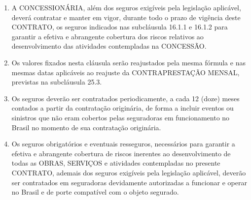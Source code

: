 \documentclass[a4paper,11pt]{report} %
\begin{document}
\begin{enumerate}
\item \label{itm:855U} A CONCESSIONÁRIA, além dos seguros exigíveis pela legislação aplicável, deverá contratar e manter em vigor, durante todo o prazo de vigência deste CONTRATO, os seguros indicados nas subcláusula 16.1.1 e 16.1.2 para garantir a efetiva e abrangente cobertura dos riscos relativos ao desenvolvimento das atividades contempladas na CONCESSÃO.


\item \label{itm:CHTJ} Os valores fixados nesta cláusula serão reajustados pela mesma fórmula e nas mesmas datas aplicáveis ao reajuste da CONTRAPRESTAÇÃO MENSAL, previstas na subcláusula 25.3.

\item \label{itm:JCKN} Os seguros deverão ser contratados periodicamente, a cada 12 (doze) meses contados a partir da contratação originária, de forma a incluir eventos ou sinistros que não eram cobertos pelas seguradoras em funcionamento no Brasil no momento de sua contratação originária. 

\item \label{itm:V83V} Os seguros obrigatórios e eventuais resseguros, necessários para garantir a efetiva e abrangente cobertura de riscos inerentes ao desenvolvimento de todas as OBRAS, SERVIÇOS e atividades contempladas no presente CONTRATO, ademais dos seguros exigíveis pela legislação aplicável, deverão ser contratados em seguradoras devidamente autorizadas a funcionar e operar no Brasil e de porte compatível com o objeto segurado. 


\end{enumerate}
\end{document}

